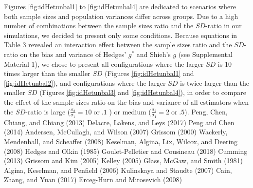 \documentclass[
  english,
  man,floatsintext]{apa6}
\begin{document}
Figures \ref{fig:idHetunbal1} to \ref{fig:idHetunbal4} are dedicated to scenarios where both sample sizes and population variances differ across groups. Due to a high number of combinations between the sample sizes ratio and the \(SD\)-ratio in our simulations, we decided to present only some conditions. Because equations in Table 3 revealed an interaction effect between the sample sizes ratio and the \(SD\)-ratio on the bias and variance of Hedges' \(g^*\) and Shieh's \(g\) (see Supplemental Material 1), we chose to present all configurations where the larger \(SD\) is 10 times larger than the smaller \(SD\) (Figures \ref{fig:idHetunbal1} and \ref{fig:idHetunbal2}), and configurations where the larger \(SD\) is twice larger than the smaller \(SD\) (Figures \ref{fig:idHetunbal3} and \ref{fig:idHetunbal4}), in order to compare the effect of the sample sizes ratio on the bias and variance of all estimators when the \(SD\)-ratio is large (\(\frac{\sigma_2}{\sigma_1}=10 \; \mathrm{or} \; .1\) ) or medium (\(\frac{\sigma_2}{\sigma_1}=2 \; \mathrm{or} \; .5\)). \color{white} Peng, Chen, Chiang, and Chiang (2013) Delacre, Lakens, and Leys (2017) Peng and Chen (2014) Andersen, McCullagh, and Wilson (2007) Grissom (2000) Wackerly, Mendenhall, and Scheaffer (2008) Keselman, Algina, Lix, Wilcox, and Deering (2008) Hedges and Olkin (1985) Goulet-Pelletier and Cousineau (2018) Cumming (2013) Grissom and Kim (2005) Kelley (2005) Glass, McGaw, and Smith (1981) Algina, Keselman, and Penfield (2006) Kulinskaya and Staudte (2007) Cain, Zhang, and Yuan (2017) Erceg-Hurn and Mirosevich (2008) \color{black}
\end{document}
